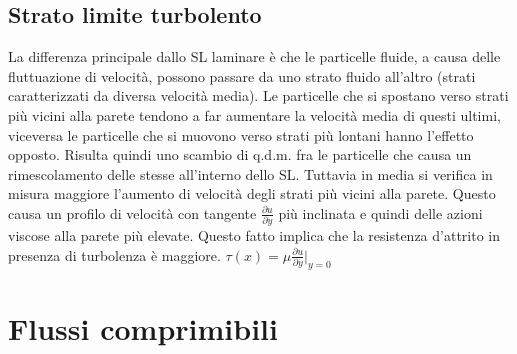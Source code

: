 \documentclass[11pt,a4paper]{report}
\begin{document}
	\section{Strato limite turbolento}
	La differenza principale dallo SL laminare è che le particelle fluide, a causa delle fluttuazione di velocità, possono passare da uno strato fluido all'altro (strati caratterizzati da diversa velocità media). Le particelle che si spostano verso strati più vicini alla parete tendono a far aumentare la velocità  media di questi ultimi, viceversa le particelle che si muovono verso strati più lontani hanno l'effetto opposto. Risulta quindi uno scambio di q.d.m. fra le particelle che causa un rimescolamento delle stesse all'interno dello SL. Tuttavia in media si verifica in misura maggiore l'aumento di velocità degli strati più vicini alla parete. Questo causa un profilo di velocità con tangente $\frac{\partial u}{\partial y}$ più inclinata e quindi delle azioni viscose alla parete più elevate. Questo fatto implica che la resistenza d'attrito in presenza di turbolenza è maggiore. $\tau(x)=\mu\frac{\partial u}{\partial y}\vert_{y=0}$


\chapter{Flussi comprimibili}
\end{document}
